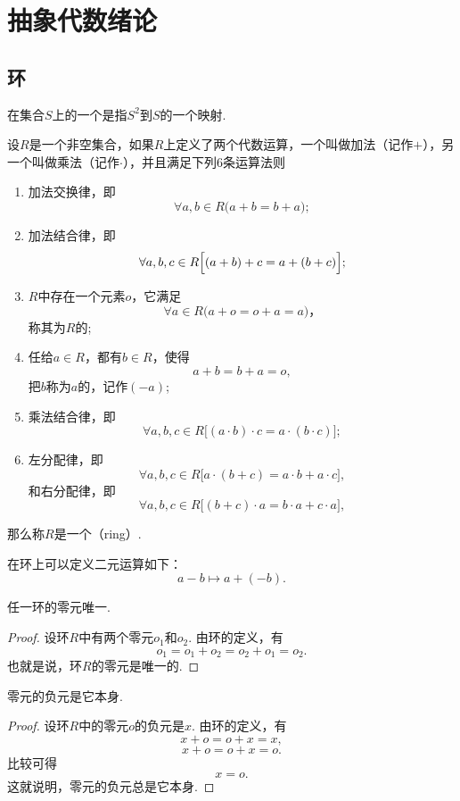 \chapter{抽象代数绪论}
\section{环}
\begin{definition}
在集合\(S\)上的一个是指\(S^2\)到\(S\)的一个映射.
\end{definition}

\begin{definition}
设\(R\)是一个非空集合，如果\(R\)上定义了两个代数运算，一个叫做加法（记作\(+\)），另一个叫做乘法（记作\(\cdot\)），并且满足下列6条运算法则\begin{enumerate}
\item 加法交换律，即\[
\forall a,b \in R \bigl(a+b = b+a\bigr);
\]
\item 加法结合律，即\[
\forall a,b,c \in R \Bigl[(a+b)+c = a+(b+c)\Bigr];
\]
\item \(R\)中存在一个元素\(o\)，它满足\[
\forall a \in R \bigl( a+o = o+a = a \bigr)，%
\]称其为\(R\)的;
\item 任给\(a \in R\)，都有\(b \in R\)，使得\[
a+b = b+a = o,
\]把\(b\)称为\(a\)的，记作\((-a)\);
\item 乘法结合律，即\[
\forall a,b,c \in R \bigl[ (a \cdot b) \cdot c = a \cdot (b \cdot c) \bigr];
\]
\item 左分配律，即\[
\forall a,b,c \in R \bigl[ a \cdot (b+c) = a \cdot b + a \cdot c \bigr],
\]和右分配律，即\[
\forall a,b,c \in R \bigl[ (b+c) \cdot a = b \cdot a + c \cdot a \bigr],
\]
\end{enumerate}那么称\(R\)是一个（ring）.

在环上可以定义二元运算如下：\[
a - b \mapsto a + (-b).
\]
\end{definition}

\begin{property}
任一环的零元唯一.
\begin{proof}
设环\(R\)中有两个零元\(o_1\)和\(o_2\).
由环的定义，有\[
o_1 = o_1 + o_2 = o_2 + o_1 = o_2.
\]也就是说，环\(R\)的零元是唯一的.
\end{proof}
\end{property}

\begin{property}
零元的负元是它本身.
\begin{proof}
设环\(R\)中的零元\(o\)的负元是\(x\).
由环的定义，有\[
x + o = o + x = x,
\]\[
x + o = o + x = o.
\]比较可得\[
x = o.
\]这就说明，零元的负元总是它本身.
\end{proof}
\end{property}

